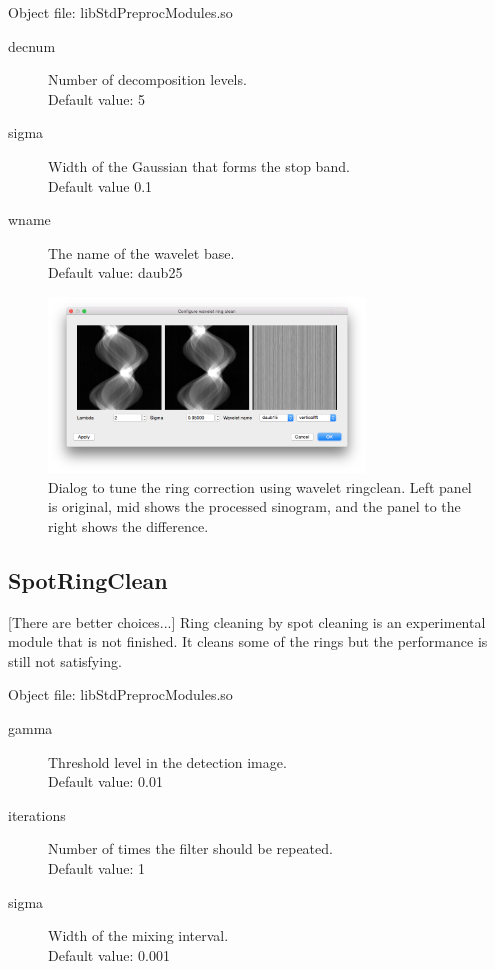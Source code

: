 \documentclass[a4paper]{scrreprt}
\begin{document}
\noindent Object file: libStdPreprocModules.so
\begin{description}
 \item[decnum] Number of decomposition levels. \\Default value: 5
 \item[sigma] Width of the Gaussian that forms the stop band. \\ Default value 0.1
 \item[wname]The name of the wavelet base. \\Default value: daub25
\end{description}
\begin{figure}[ht!]
\centering
\includegraphics[width=0.75\textwidth]{figures3/WaveletRingCleanDlg.png}
\caption{Dialog to tune the ring correction using wavelet ringclean. Left panel is original, mid shows the processed sinogram, and the panel to the right shows the difference.}
\end{figure}

\subsection{SpotRingClean}
[There are better choices...] Ring cleaning by spot cleaning is an experimental module that is not finished. It cleans some of the rings but the performance is still not satisfying.

Object file: libStdPreprocModules.so
\begin{description}
 \item[gamma] Threshold level in the detection image. \\Default value: 0.01
 \item[iterations] Number of times the filter should be repeated. \\Default value: 1
 \item[sigma] Width of the mixing interval. \\ Default value: 0.001
\end{description}
\end{document}
